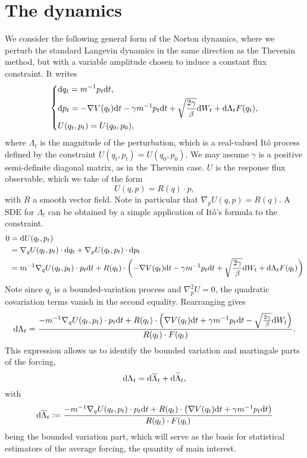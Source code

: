 \section{The dynamics}
We consider the following general form of the Norton dynamics, where we perturb the standard Langevin dynamics in the same direction as the Thevenin method, but with a variable amplitude chosen to induce a constant flux constraint.
It writes
\begin{equation}
    \label{eq:norton_sv_dynamics_alt}
    \left\{ 
        \begin{aligned}
            &\mathrm{d} q_t=m^{-1}p_t\mathrm{d} t,\\
            &\mathrm{d} p_t=-\nabla V(q_t)\mathrm{d} t-\gamma m^{-1}p_t\mathrm{d} t +\sqrt{\frac{2\gamma}\beta}\mathrm{d} W_t +\mathrm{d} \Lambda_t F(q_t),\\
            &U(q_t,p_t)=U(q_0,p_0),
        \end{aligned}
    \right.
\end{equation}
where $\Lambda_t$ is the magnitude of the perturbation, which is a real-valued Itô process defined by the constraint $U(q_t,p_t)=U(q_0,p_0)$.
We may assume $\gamma$ is a positive semi-definite diagonal matrix, as in the Thevenin case. $U$ is the response flux observable, which we take of the form
\[U(q,p)=R(q)\cdot p,\]
with $R$ a smooth vector field. Note in particular that $\nabla_p U(q,p)=R(q)$.
A SDE for $\Lambda_t$ can be obtained by a simple application of Itô's formula to the constraint.
\begin{align*}
    0&=\mathrm{d} U(q_t,p_t)\\
    &=\nabla_q U(q_t,p_t)\cdot \mathrm{d} q_t+\nabla_p U(q_t,p_t)\cdot \mathrm{d} p_t\\
    &=m^{-1}\nabla_q U(q_t,p_t) \cdot p_t \mathrm{d} t + R(q_t)\cdot \left(-\nabla V(q_t)\mathrm{d} t-\gamma m^{-1}p_t\mathrm{d} t +\sqrt{\frac{2\gamma}\beta}\mathrm{d} W_t +\mathrm{d} \Lambda_t F(q_t)\right)\\
\end{align*}
Note since $q_t$ is a bounded-variation process and $\nabla^2_p U=0$, the quadratic covariation terms vanish in the second equality. Rearranging gives 
\begin{equation}
    \label{eq:norton_sv_forcing_sde}
    \mathrm{d}\Lambda_t = \frac{-m^{-1}\nabla_q U(q_t,p_t)\cdot p_t \mathrm{d} t+R(q_t)\cdot\left(\nabla V(q_t)\mathrm{d} t+\gamma m^{-1}p_t\mathrm{d} t-\sqrt{\frac{2\gamma}\beta}\mathrm{d} W_t \right)}{R(q_t)\cdot F(q_t)}.
\end{equation}
This expression allows us to identify the bounded variation and martingale parts of the forcing, 
\begin{equation}
    \mathrm{d} \Lambda_t=\mathrm{d} \overline{\Lambda}_t+\mathrm{d} \widetilde{\Lambda}_t,
\end{equation}
with 
\begin{equation}
    \label{eq:norton_sv_forcing_bv_part}
    \mathrm{d} \overline{\Lambda}_t\mathrel{\mathop:}= \frac{-m^{-1}\nabla_q U(q_t,p_t)\cdot p_t \mathrm{d} t+R(q_t)\cdot\left(\nabla V(q_t)\mathrm{d} t+\gamma m^{-1}p_t\mathrm{d} t\right)}{R(q_t)\cdot F(q_t)}
\end{equation}
being the bounded variation part, which will serve as the basis for statistical estimators of the average forcing, the quantity of main interest.

